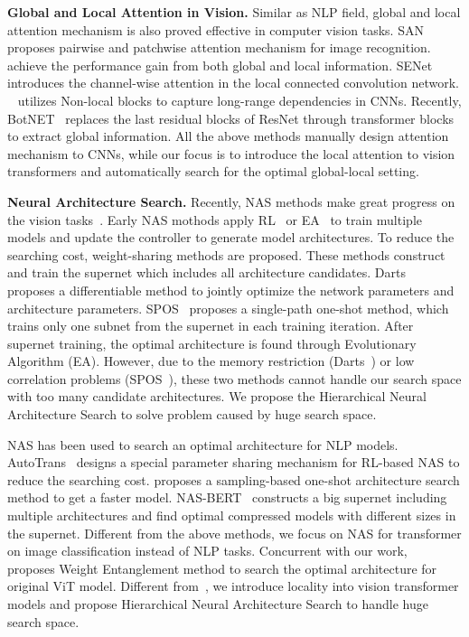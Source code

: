 \documentclass[10pt,twocolumn,letterpaper]{article}
\begin{document}
\noindent\textbf{Global and Local Attention  in Vision. }Similar as NLP field, global and local attention mechanism is also proved effective in computer vision tasks. SAN~\cite{SANet-CVPR20} proposes pairwise and patchwise attention mechanism for image recognition. ~\cite{SEnet, Non-local} achieve the performance gain from both global and local information. SENet~\cite{SEnet} introduces the channel-wise attention in the local connected convolution network.  ~\cite{Non-local} utilizes Non-local blocks to capture long-range dependencies in CNNs. Recently, BotNET~\cite{BotNet} replaces the last residual blocks of ResNet through transformer blocks to extract global information. 
All the above methods manually design attention mechanism to CNNs, while our focus is to introduce the local attention to vision transformers and automatically search for the optimal global-local setting. 




\noindent\textbf{Neural Architecture Search.}
Recently, NAS methods make great progress on the vision tasks~\cite{chen2021bnnas,ci2020evolving, liu2021inception, zhou2020econas, li2020improving, liang2019computation}.
Early NAS mothods apply RL~\cite{RLnas-ICML17-BelloZVL, NasNet-CVPR18-Zoph} or EA~\cite{AmoebaNet-AAAI19-Real} to train multiple models and update the controller to generate model architectures. 
To reduce the searching cost, weight-sharing methods are proposed. These methods construct and train the supernet which includes all architecture candidates. Darts~\cite{Darts-ICLR19-Liu} proposes a differentiable method to jointly optimize the network parameters and architecture parameters. SPOS~\cite{SPOS-ECCV20-Guo} proposes a single-path one-shot method, which trains only one subnet from the supernet in each training iteration. After supernet training, the optimal architecture is found through Evolutionary Algorithm (EA). However, due to the memory restriction (Darts~\cite{Darts-ICLR19-Liu}) or low correlation problems (SPOS~\cite{SPOS-ECCV20-Guo}), these two methods cannot handle our search space with too many candidate architectures. 
We propose the Hierarchical Neural Architecture Search to solve problem caused by huge search space.

NAS has been used to search an optimal architecture for NLP models.
AutoTrans~\cite{autotrans} designs a special parameter sharing mechanism for RL-based NAS to reduce the searching cost. 
\cite{findfast-2020} proposes a sampling-based one-shot architecture search method to get a faster model.
NAS-BERT~\cite{TASKAG-2020}  constructs a big supernet including multiple architectures and find optimal compressed models with different sizes in the supernet.
Different from the above methods, we focus on NAS for transformer on image classification instead of NLP tasks. Concurrent with our work, ~\cite{autoformer} proposes  Weight Entanglement method to search the optimal architecture for original ViT model. Different from~\cite{autoformer}, we introduce locality into  vision transformer models and propose Hierarchical Neural Architecture Search to handle huge search space.
\end{document}
